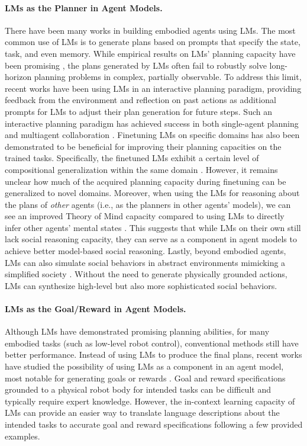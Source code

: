 \documentclass{article}
\begin{document}
\paragraph{LMs as the Planner in Agent Models.}
There have been many works in building embodied agents using LMs. The most common use of LMs is to generate plans based on prompts that specify the state, task, and even memory. While empirical results on LMs' planning capacity have been promising \citep{huang2022language}, the plans generated by LMs often fail to robustly solve long-horizon planning problems in complex, partially observable. To address this limit, recent works have been using LMs in an interactive planning paradigm, providing feedback from the environment and reflection on past actions as additional prompts for LMs to adjust their plan generation for future steps. Such an interactive planning paradigm has achieved success in both single-agent planning \citep[e.g.,][]{dasgupta2023collaborating, wang2023describe} and multiagent collaboration \citep[e.g.,][]{mandi2023roco, zhang2023building}. Finetuning LMs on specific domains has also been demonstrated to be beneficial for improving their planning capacities on the trained tasks. Specifically, the finetuned LMs exhibit a certain level of compositional generalization within the same domain \citep{li2022pre}. However, it remains unclear how much of the acquired planning capacity during finetuning can be generalized to novel domains. Moreover, when using the LMs for reasoning about the plans of \textit{other} agents (i.e., as the planners in other agents' models), we can see an improved Theory of Mind capacity compared to using LMs to directly infer other agents' mental states \citep{jin2023mmtom}. This suggests that while LMs on their own still lack social reasoning capacity, they can serve as a component in agent models to achieve better model-based social reasoning. Lastly, beyond embodied agents, LMs can also simulate social behaviors in abstract environments mimicking a simplified society \citep{park2023generative}. Without the need to generate physically grounded actions, LMs can synthesize high-level but also more sophisticated social behaviors. 

\paragraph{LMs as the Goal/Reward in Agent Models.} Although LMs have demonstrated promising planning abilities, for many embodied tasks (such as low-level robot control), conventional methods still have better performance. Instead of using LMs to produce the final plans, recent works have studied the possibility of using LMs as a component in an agent model, most notable for generating goals \citep{xie2023translating} or rewards \citep{yu2023language,kwon2023reward,ma2023eureka}. Goal and reward specifications grounded to a physical robot body for intended tasks can be difficult and typically require expert knowledge. However, the in-context learning capacity of LMs can provide an easier way to translate language descriptions about the intended tasks to accurate goal and reward specifications following a few provided examples.
\end{document}
